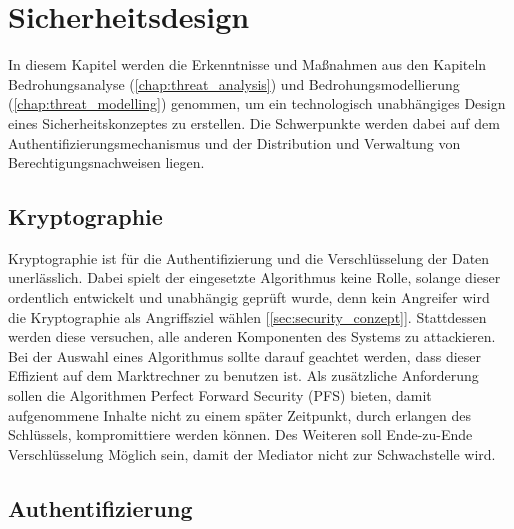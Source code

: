 \documentclass[11pt,a4paper]{report}
\begin{document}
\chapter{Sicherheitsdesign} \label{chap:design}

In diesem Kapitel werden die Erkenntnisse und Maßnahmen aus den Kapiteln Bedrohungsanalyse (\ref{chap:threat_analysis}) und Bedrohungsmodellierung (\ref{chap:threat_modelling}) genommen, um ein technologisch unabhängiges Design eines Sicherheitskonzeptes zu erstellen. Die Schwerpunkte werden dabei auf dem Authentifizierungsmechanismus und der Distribution und Verwaltung von Berechtigungsnachweisen liegen.

\section{Kryptographie}

Kryptographie ist für die Authentifizierung und die Verschlüsselung der Daten unerlässlich. Dabei spielt der eingesetzte Algorithmus keine Rolle, solange dieser ordentlich entwickelt und unabhängig geprüft wurde, denn kein Angreifer wird die Kryptographie als Angriffsziel wählen [\ref{sec:security_conzept}]. Stattdessen werden diese versuchen, alle anderen Komponenten des Systems zu attackieren. Bei der Auswahl eines Algorithmus sollte darauf geachtet werden, dass dieser Effizient auf dem Marktrechner zu benutzen ist. Als zusätzliche Anforderung sollen die Algorithmen Perfect Forward Security (PFS) bieten, damit aufgenommene Inhalte nicht zu einem später Zeitpunkt, durch erlangen des Schlüssels, kompromittiere werden können. Des Weiteren soll Ende-zu-Ende Verschlüsselung Möglich sein, damit der Mediator nicht zur Schwachstelle wird.

\section{Authentifizierung}
\end{document}
